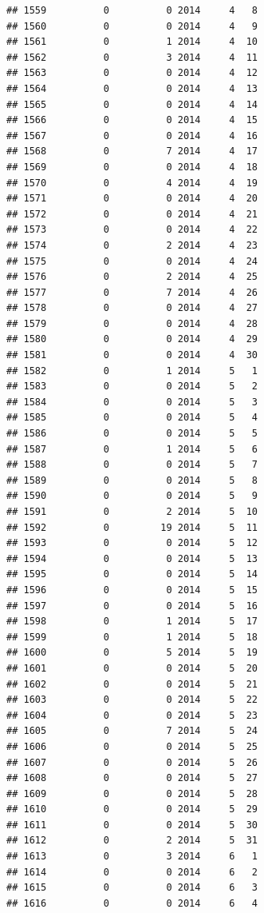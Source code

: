 \documentclass[
]{article}
\begin{document}
\begin{verbatim}
## 1559          0          0 2014     4   8
## 1560          0          0 2014     4   9
## 1561          0          1 2014     4  10
## 1562          0          3 2014     4  11
## 1563          0          0 2014     4  12
## 1564          0          0 2014     4  13
## 1565          0          0 2014     4  14
## 1566          0          0 2014     4  15
## 1567          0          0 2014     4  16
## 1568          0          7 2014     4  17
## 1569          0          0 2014     4  18
## 1570          0          4 2014     4  19
## 1571          0          0 2014     4  20
## 1572          0          0 2014     4  21
## 1573          0          0 2014     4  22
## 1574          0          2 2014     4  23
## 1575          0          0 2014     4  24
## 1576          0          2 2014     4  25
## 1577          0          7 2014     4  26
## 1578          0          0 2014     4  27
## 1579          0          0 2014     4  28
## 1580          0          0 2014     4  29
## 1581          0          0 2014     4  30
## 1582          0          1 2014     5   1
## 1583          0          0 2014     5   2
## 1584          0          0 2014     5   3
## 1585          0          0 2014     5   4
## 1586          0          0 2014     5   5
## 1587          0          1 2014     5   6
## 1588          0          0 2014     5   7
## 1589          0          0 2014     5   8
## 1590          0          0 2014     5   9
## 1591          0          2 2014     5  10
## 1592          0         19 2014     5  11
## 1593          0          0 2014     5  12
## 1594          0          0 2014     5  13
## 1595          0          0 2014     5  14
## 1596          0          0 2014     5  15
## 1597          0          0 2014     5  16
## 1598          0          1 2014     5  17
## 1599          0          1 2014     5  18
## 1600          0          5 2014     5  19
## 1601          0          0 2014     5  20
## 1602          0          0 2014     5  21
## 1603          0          0 2014     5  22
## 1604          0          0 2014     5  23
## 1605          0          7 2014     5  24
## 1606          0          0 2014     5  25
## 1607          0          0 2014     5  26
## 1608          0          0 2014     5  27
## 1609          0          0 2014     5  28
## 1610          0          0 2014     5  29
## 1611          0          0 2014     5  30
## 1612          0          2 2014     5  31
## 1613          0          3 2014     6   1
## 1614          0          0 2014     6   2
## 1615          0          0 2014     6   3
## 1616          0          0 2014     6   4

\end{verbatim}
\end{document}
